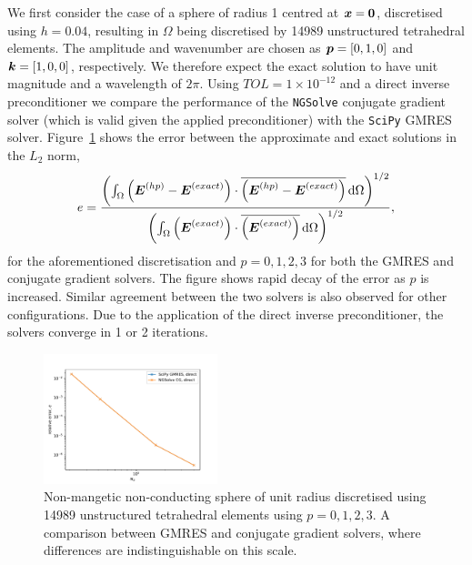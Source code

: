 \documentclass[a4paper,12]{elsarticle}
\theoremstyle{definition}
\renewcommand{\vec}[1]{\mbox{\boldmath$#1$}}
\begin{document}
We first consider the case of a sphere of radius 1 centred at $\vec{x}=\vec{0}$, discretised using $h=0.04$, resulting in $\Omega$ being discretised by 14989 unstructured tetrahedral elements. The amplitude and wavenumber are chosen as $\vec{p} = [0,1,0]$ and $\vec{k}=[1,0,0]$, respectively. We therefore expect the exact solution to have unit magnitude and a wavelength of $2\pi$. 
Using $TOL=1\times 10^{-12}$ and a direct inverse preconditioner we compare the performance of the \texttt{NGSolve} conjugate gradient solver (which is valid given the applied preconditioner) with the \texttt{SciPy} GMRES solver. Figure~\ref{fig:sphere_solver_comparison} shows the error between the approximate and exact solutions in the $L_2$ norm,
\begin{equation}
e = \frac{\left(\int_\Omega \left(\vec{E}^{(hp)} - \vec{E}^{(exact)}\right) \cdot \overline{\left(\vec{E}^{(hp)} - \vec{E}^{(exact)}\right)} \, \mathrm{d}\Omega\right)^{1/2}}{\left(\int_\Omega \left(\vec{E}^{(exact)}\right) \cdot \overline{\left(\vec{E}^{(exact)}\right)} \, \mathrm{d}\Omega\right)^{1/2}},
\end{equation}
for the aforementioned discretisation and $p=0,1,2,3$ for both the GMRES and conjugate gradient solvers. The figure shows rapid decay of the error as $p$ is increased. Similar agreement between the two solvers is also observed for other configurations. Due to the application of the direct inverse preconditioner, the solvers converge in 1 or 2 iterations.

\begin{figure}
\centering
\includegraphics[width=0.45\textwidth]{Sphere_convergence_scipy_ngsolve_comp.pdf}
\caption{Non-mangetic non-conducting sphere of unit radius discretised using 14989 unstructured tetrahedral elements using $p=0,1,2,3$. A comparison between GMRES and conjugate gradient solvers, where differences are indistinguishable on this scale.}
\label{fig:sphere_solver_comparison}
\end{figure}
\end{document}
